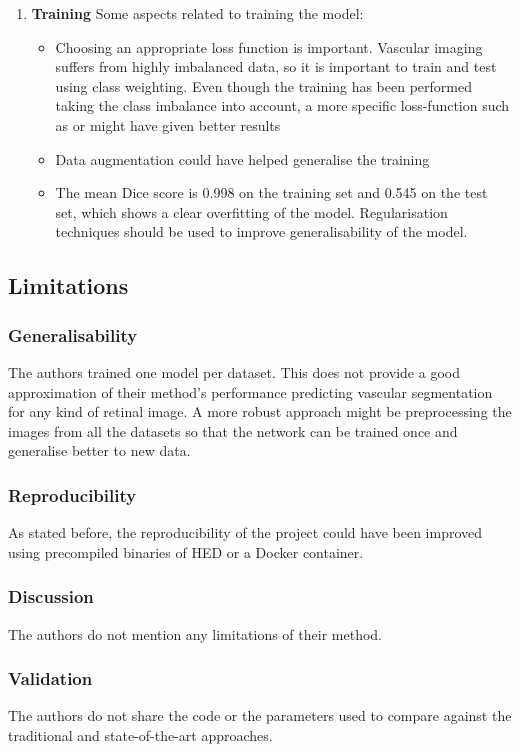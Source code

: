 \begin{enumerate}
  \item \textbf{Training} Some aspects related to training the model:
    \begin{itemize}
      \item Choosing an appropriate loss function is important. Vascular imaging suffers from highly imbalanced data, so it is important to train and test using class weighting. Even though the training has been performed taking the class imbalance into account, a more specific loss-function such as \cite{sudre_generalised_2017} or \cite{fidon_generalised_2018} might have given better results
      \item Data augmentation could have helped generalise the training
      \item The mean Dice score is 0.998 on the training set and 0.545 on the test set, which shows a clear overfitting of the model. Regularisation techniques should be used to improve generalisability of the model.
    \end{itemize}
\end{enumerate}


\subsection{Limitations}

\subsubsection{Generalisability}
The authors trained one model per dataset. This does not provide a good approximation of their method's performance predicting vascular segmentation for any kind of retinal image. A more robust approach might be preprocessing the images from all the datasets so that the network can be trained once and generalise better to new data.

\subsubsection{Reproducibility}
As stated before, the reproducibility of the project could have been improved using precompiled binaries of HED or a Docker container.

\subsubsection{Discussion}
The authors do not mention any limitations of their method.

\subsubsection{Validation}
The authors do not share the code or the parameters used to compare against the traditional and state-of-the-art approaches.


